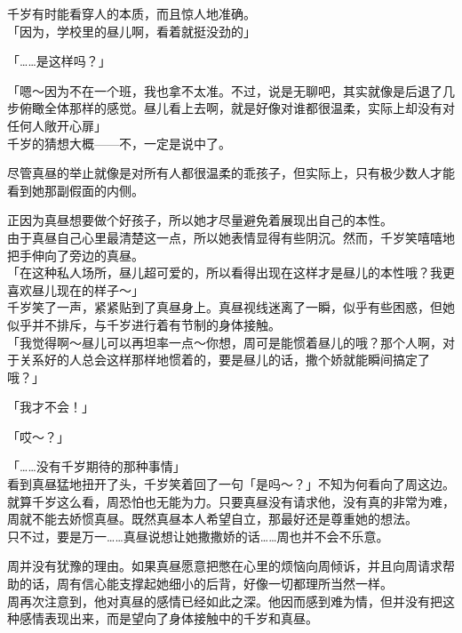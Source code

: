 千岁有时能看穿人的本质，而且惊人地准确。\\

「因为，学校里的昼儿啊，看着就挺没劲的」

「……是这样吗？」

「嗯～因为不在一个班，我也拿不太准。不过，说是无聊吧，其实就像是后退了几步俯瞰全体那样的感觉。昼儿看上去啊，就是好像对谁都很温柔，实际上却没有对任何人敞开心扉」\\

千岁的猜想大概——不，一定是说中了。

尽管真昼的举止就像是对所有人都很温柔的乖孩子，但实际上，只有极少数人才能看到她那副假面的内侧。

正因为真昼想要做个好孩子，所以她才尽量避免着展现出自己的本性。\\

由于真昼自己心里最清楚这一点，所以她表情显得有些阴沉。然而，千岁笑嘻嘻地把手伸向了旁边的真昼。\\

「在这种私人场所，昼儿超可爱的，所以看得出现在这样才是昼儿的本性哦？我更喜欢昼儿现在的样子～」\\

千岁笑了一声，紧紧贴到了真昼身上。真昼视线迷离了一瞬，似乎有些困惑，但她似乎并不排斥，与千岁进行着有节制的身体接触。\\

「我觉得啊～昼儿可以再坦率一点～你想，周可是能惯着昼儿的哦？那个人啊，对于关系好的人总会这样那样地惯着的，要是昼儿的话，撒个娇就能瞬间搞定了哦？」

「我才不会！」

「哎～？」

「……没有千岁期待的那种事情」\\

看到真昼猛地扭开了头，千岁笑着回了一句「是吗～？」不知为何看向了周这边。\\

就算千岁这么看，周恐怕也无能为力。只要真昼没有请求他，没有真的非常为难，周就不能去娇惯真昼。既然真昼本人希望自立，那最好还是尊重她的想法。\\

只不过，要是万一……真昼说想让她撒撒娇的话……周也并不会不乐意。

周并没有犹豫的理由。如果真昼愿意把憋在心里的烦恼向周倾诉，并且向周请求帮助的话，周有信心能支撑起她细小的后背，好像一切都理所当然一样。\\

周再次注意到，他对真昼的感情已经如此之深。他因而感到难为情，但并没有把这种感情表现出来，而是望向了身体接触中的千岁和真昼。\\

